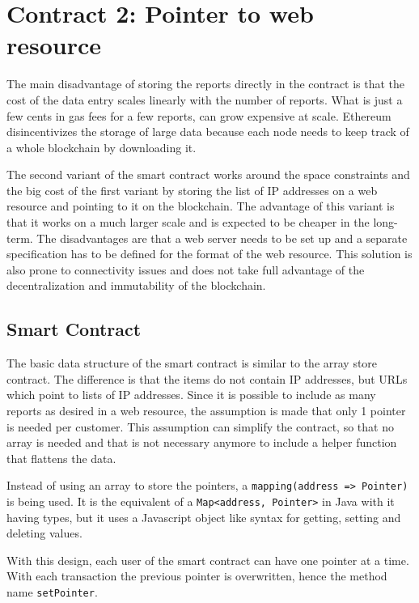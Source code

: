\section{Contract 2: Pointer to web resource}
The main disadvantage of storing the reports directly in the contract is that the cost of the data entry scales linearly with the number of reports. What is just a few cents in gas fees for a few reports, can grow expensive at scale.
Ethereum disincentivizes the storage of large data because each node needs to keep track of a whole blockchain by downloading it. 

The second variant of the smart contract works around the space constraints and the big cost of the first variant by storing the list of IP addresses on a web resource and pointing to it on the blockchain. The advantage of this variant is that it works on a much larger scale and is expected to be cheaper in the long-term. The disadvantages are that a web server needs to be set up and a separate specification has to be defined for the format of the web resource. This solution is also prone to connectivity issues and does not take full advantage of the decentralization and immutability of the blockchain.

\subsection{Smart Contract}
The basic data structure of the smart contract is similar to the array store contract. The difference is that the items do not contain IP addresses, but URLs which point to lists of IP addresses. Since it is possible to include as many reports as desired in a web resource, the assumption is made that only 1 pointer is needed per customer. This assumption can simplify the contract, so that no array is needed and that is not necessary anymore to include a helper function that flattens the data.



Instead of using an array to store the pointers, a \texttt{mapping(address => Pointer)} is being used. It is the equivalent of a \texttt{Map<address, Pointer>} in Java with it having types, but it uses a Javascript object like syntax for getting, setting and deleting values.

With this design, each user of the smart contract can have one pointer at a time. With each transaction the previous pointer is overwritten, hence the method name \texttt{setPointer}.

